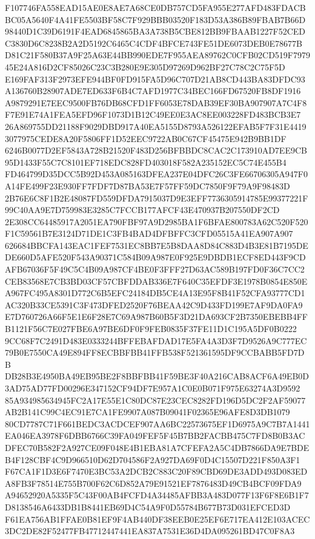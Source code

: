\documentclass[UTF8,fontset=fandol,zihao=-4,a4paper]{ctexart}
\begin{document}
{{F107746FA558EAD15AE0E8AE7A68CE0DB757CD5FA955E277AFD483FDACBBC05A5640F4A41FE5503BF58C7F929BBB03520F183D53A386B89FBAB7B66D
98440D1C39D6191F4EAD6845865BA3A738B5CBE812BB9FBAAB1227F52CEDC3830D6C8238B2A2D5192C6465C4CDF4BFCE743FE51DE6073DEB0E78677B
D81C21F580B37A9F25A63E44BB990EDE7F955AEA89762C0CFB02CD519F797945E24A816D2CF85026C23C3B280E9E305D97269D962BF27C78C2C75F5D
E169FAF313F2973EFE944BF0FD915FA5D96C707D21AB8CD443BA83DFDC93A136760B28907ADE7ED633F6B4C7AFD1977C34BEC166FD67520FB8DF1916
A9879291E7EEC9500FB76DB68CFD1FF6053E78DAB39EF30BA907907A7C4F8F7E91E74A1FEA5EFD96F1073D1B12C49EE0E3AC8EE003228FD483BCB3E7
26A869755DD21188F9029DBD917A40EA5155D8793A526122EFAB5F7F31E44193077975CEDE8A20F5806FF1D52EEC9722AB0C67CF45475E942B9BB1DF
6246B0077D2EF5843A728B21520F483D256BFBBDC8CAC2C173910AD7EE9CB95D1433F55C7C8101EF718EDC828FD403018F582A235152EC5C74E455B4
FD464799D35DCC5B92D453A085163DFEA237E04DFC26C3FE66706305A947F0A14FE499F23E930FF7FDF7D87BA53E7F57FF59DC7850F9F79A9F98483D
2B76E6C8F1B2E48087FD559DFDA7915037D9E3EFF7736305914785E99377221F99C40AA9E7D759983E3285C7FCCB177AFCF43E470937B207550DF2CD
2E308CC64485917A2051EA790FBF97A9D2985BA1F6BFAE800783A62C520F520F1C59561B7E3124D71DE1C3FB4BAD4DFBFFC3CFD05515A41EA907A907
626684BBCFA143EAC1FEF7531EC8BB7E5B8DAA8D84C883D4B3E81B7195DEDE660D5AFE520F543A90371C584B09A987E0F925E9DBDB1ECF8ED443F9CD
AFB67036F5F49C5C4B09A987CF4BE0F3FFF27D63AC589B197FD0F36C7CC2CEB83568E7CB3BD03CF57CBFDDAB336E7F640C35EFDF3E1978B0854E850E
A967FC495A8301D772C6B5EFC24184DB5CE4A13E95F8B41F52CFA93777CD1AC320B33CE5391C3F473DFED2520F76BEAA42C9D433FD199E7AF9DA0FA9
E7D760726A66F5E1E6F28E7C69A987B60B5F3D21DA693CF2B7350EBEBB4FFB1121F56C7E027FBE6A97BE6DF0F9FEB0835F37FE11D1C195A5DF0B0222
9CC68F7C2491D483E0333244BFFEBAFDAD17E5FA4A3D3F7D9526A9C777EC79B0E7550CA49E894FF8ECBBFBB41FFB538F521361595DF9CCBABB5FD7DB
DB28B3E4950BA49EB95BE2F8BBFBB41F59BE3F40A216CAB8ACF6A49EB0D3AD75AD77FD00296E347152CF94DF7E957A1C0E0B071F975E63274A3D9592
85A934985634945FC2A17E55E1C80DC87E23CEC8282FD196D5DC2F2AF59077AB2B141C99C4EC91E7CA1FE9907A087B09041F02365E96AFE8D3DB1079
80CD7787C71F661BEDC3ACDCEF907AA6BC22573675EF1D6975A9C7B7A1441EA046EA3978F6DBB6766C39FA049FEF5F45B7BB2FACBB475C7FD8B0B3AC
DFEC70B582F2A927CE09F048E4B1EBA81A7CFEFA2A5C4DB7866DA9E7BDEB4F128CBF4C9D966510D62D704586F2A927DA69F0D4C15507D221F850A3F1
F67CA1F1D3E6F7470E3BC53A2DCB2C883C20F89CBD69DE3ADD493D083EDA8FB3F78514E755B700F62C6D852A79E91521EF7876483D49CB4BCF09FDA9
A94652920A5335F5C43F00AB4FCFD4A34485AFBB3A483D077F13F6F8E6B1F7D8138546A6433DB1B8441EB69D4C54A9F0D55784B677B73D031EFCED3D
F61EA756AB1FFAE0B81EF9F4AB440DF38EEB0E25EF6E717EA412E103ACEC3DC2DE82F52477FB47712447441EA837A7531E36D4DA095261BD47C0F8A3
}}
\end{document}
